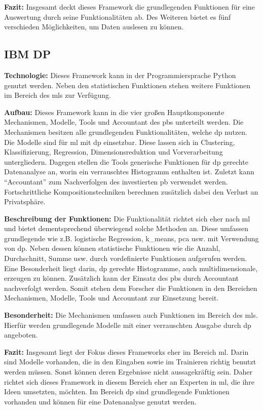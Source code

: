 \textbf{Fazit: }
Insgesamt deckt dieses Framework die grundlegenden Funktionen für eine Auswertung durch seine Funktionalitäten ab. Des Weiteren bietet es fünf verschieden Möglichkeiten, um Daten auslesen zu können.

\subsection{IBM DP}
\textbf{Technologie: }
Dieses Framework \parencite{diffprivlib} kann in der Programmiersprache Python genutzt werden. Neben den statistischen Funktionen stehen weitere Funktionen im Bereich des \gls{ml}s zur Verfügung.

\textbf{Aufbau: }
Dieses Framework kann in die vier großen Hauptkomponente Mechanismen, Modelle, Tools und Accountant des \gls{pb}s unterteilt werden. Die Mechanismen besitzen alle grundlegenden Funktionalitäten, welche \gls{dp} nutzen. 
Die Modelle sind für \gls{ml} mit \gls{dp} einsetzbar. Diese lassen sich in Clustering, Klassifizierung, Regression, Dimensionsreduktion und Vorverarbeitung untergliedern. Dagegen stellen die Tools generische Funktionen für \gls{dp} gerechte Datenanalyse an, worin ein verrauschtes Histogramm enthalten ist. Zuletzt kann \enquote{Accountant} zum Nachverfolgen des investierten \gls{pb} verwendet werden. Fortschrittliche Kompositionstechniken berechnen zusätzlich dabei den Verlust an Privatsphäre.

\textbf{Beschreibung der Funktionen: }
Die Funktionalität richtet sich eher nach \gls{ml} und bietet dementsprechend überwiegend solche Methoden an. Diese umfassen grundlegende wie z.B. logistische Regression, k\_means, pca usw. mit Verwendung von \gls{dp}.
Neben dessen können statistische Funktionen wie die Anzahl, Durchschnitt, Summe usw. durch vordefinierte Funktionen aufgerufen werden. Eine Besonderheit liegt darin, \gls{dp} gerechte Histogramme, auch multidimensionale, erzeugen zu können. Zusätzlich kann der Einsatz des \gls{pb}s durch Accountant nachverfolgt werden. Somit stehen dem Forscher die Funktionen in den Bereichen Mechanismen, Modelle, Tools und Accountant zur Einsetzung bereit.

\textbf{Besonderheit: }
Die Mechanismen umfassen auch Funktionen im Bereich des \gls{ml}s. Hierfür werden grundlegende Modelle mit einer verrauschten Ausgabe durch \gls{dp} angeboten.

\textbf{Fazit: }
Insgesamt liegt der Fokus dieses Frameworks eher im Bereich \gls{ml}. Darin sind Modelle vorhanden, die in den Eingaben sowie im Trainieren richtig benutzt werden müssen. Sonst können deren Ergebnisse nicht aussagekräftig sein. Daher richtet sich dieses Framework in diesem Bereich eher an Experten in \gls{ml}, die ihre Ideen umsetzten, möchten. Im Bereich \gls{dp} sind grundlegende Funktionen vorhanden und können für eine Datenanalyse genutzt werden.

